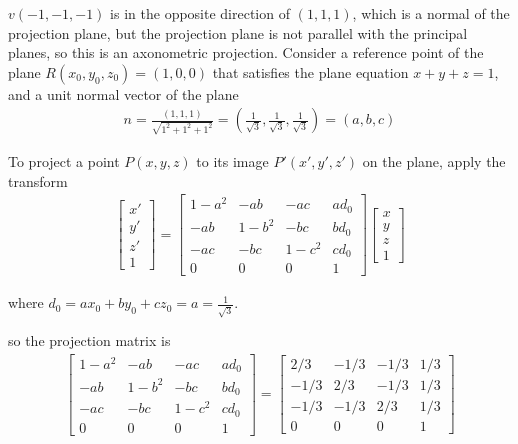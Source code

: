 \documentclass[11pt]{article}  %
\begin{document}
    \solution
    
    $v(-1,-1,-1)$ is in the opposite direction of $(1,1,1)$, which is a normal of the projection plane, but the projection plane is not parallel with the principal planes, so this is an axonometric projection. Consider a reference point of the plane $R(x_0,y_0,z_0)=(1,0,0)$ that satisfies the plane equation $x + y + z = 1$, and a unit normal vector of the plane
    \begin{align*}
        n=\frac{(1,1,1)}{\sqrt{1^2+1^2+1^2}}=(\frac{1}{\sqrt{3}},\frac{1}{\sqrt{3}},\frac{1}{\sqrt{3}})=(a,b,c)
    \end{align*}
    
    To project a point $P(x,y,z)$ to its image $P'(x',y',z')$ on the plane, apply the transform
    \begin{align*}
        \begin{bmatrix}
            x'\\y'\\z'\\1
        \end{bmatrix}
        =
        \begin{bmatrix}
            1-a^2 & -ab & -ac & ad_0\\
            -ab & 1-b^2 & -bc & bd_0\\
            -ac & -bc & 1-c^2 & cd_0\\
            0   &  0  &   0   & 1
        \end{bmatrix}
        \begin{bmatrix}
            x\\y\\z\\1
        \end{bmatrix}
    \end{align*}
    
    where $d_0=ax_0 + by_0 + cz_0=a=\frac{1}{\sqrt{3}}$.\vspace{1mm}
    
    so the projection matrix is
    \begin{align*}
        \begin{bmatrix}
            1-a^2 & -ab & -ac & ad_0\\
            -ab & 1-b^2 & -bc & bd_0\\
            -ac & -bc & 1-c^2 & cd_0\\
            0   &  0  &   0   & 1
        \end{bmatrix}
        =
        \begin{bmatrix}
            2/3 & -1/3 & -1/3 & 1/3\\
            -1/3 & 2/3 & -1/3 & 1/3\\
            -1/3 & -1/3 & 2/3 & 1/3\\
            0   &  0  &   0   & 1
        \end{bmatrix}
    \end{align*}
\end{document}

